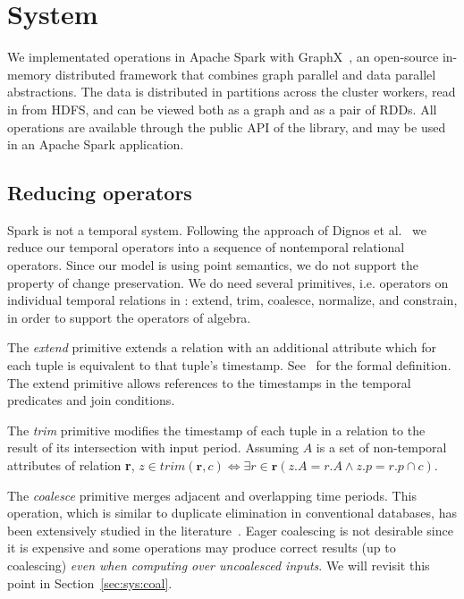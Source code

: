 \section{System}
\label{sec:sys}

We implementated \ql operations in Apache Spark with
GraphX~\cite{DBLP:conf/osdi/GonzalezXDCFS14}, an open-source in-memory
distributed framework that combines graph parallel and data parallel
abstractions.  The data is distributed in partitions across the
cluster workers, read in from HDFS, and can be viewed both as a graph
and as a pair of RDDs.  All \tg operations are available through the
public API of the \ql library, and may be used in an Apache Spark
application.

\subsection{Reducing operators}
\label{sec:sys:reduce}

Spark is not a temporal system.  Following the approach of Dignos et
al.~\cite{Dignos2012} we reduce our temporal operators into a sequence
of nontemporal relational operators.  Since our model is using point
semantics, we do not support the property of change preservation.  We
do need several primitives, i.e. operators on individual temporal
relations in \tve: extend, trim, coalesce, normalize, and constrain, in
order to support the operators of \ql algebra.

The {\em extend} primitive extends a relation with an additional
attribute which for each tuple is equivalent to that tuple's
timestamp.  See~\cite{Dignos2012} for the formal definition.  The
extend primitive allows references to the timestamps in the temporal
predicates and join conditions.

The {\em trim} primitive modifies the timestamp of each tuple in a
relation to the result of its intersection with input period.
Assuming $A$ is a set of non-temporal attributes of relation {\bf r},
$z \in trim(\mathbf{r},c) \iff \exists r \in \mathbf{r}(z.A = r.A
\wedge z.p = r.p \cap c)$.

The {\em coalesce} primitive merges adjacent and overlapping time
periods.  This operation, which is similar to duplicate elimination in
conventional databases, has been extensively studied in the
literature~\cite{DBLP:conf/vldb/BohlenSS96,DBLP:journals/sigmod/Zimanyi06}.
Eager coalescing is not desirable since it is expensive and some
operations may produce correct results (up to coalescing) {\em even
  when computing over uncoalesced inputs}.  We will revisit this point in
Section~\ref{sec:sys:coal}.

